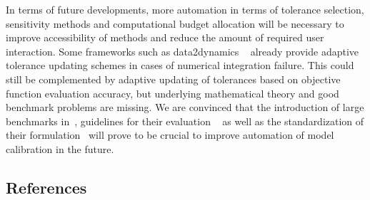 \documentclass[11pt]{article}
\begin{document}
In terms of future developments, more automation in terms of tolerance
selection, sensitivity methods and computational budget allocation will
be necessary to improve accessibility of methods and reduce the amount
of required user interaction. Some frameworks such as data2dynamics
~\cite{2754712/RYRYBYZA} already provide adaptive tolerance updating
schemes in cases of numerical integration failure. This could still be
complemented by adaptive updating of tolerances based on objective
function evaluation accuracy, but underlying mathematical theory and
good benchmark problems are missing. We are convinced that the
introduction of large benchmarks in~\cite{2754712/FMD3RVCR,2754712/INKV577L}, guidelines for their evaluation
~\cite{2754712/NYMSV8TA} as well as the standardization of their
formulation~\cite{2754712/86CV69R2} will prove to be crucial to improve
automation of model calibration in the future.

    \hypertarget{references}{%
\subsection{References}\label{references}}



\end{document}
